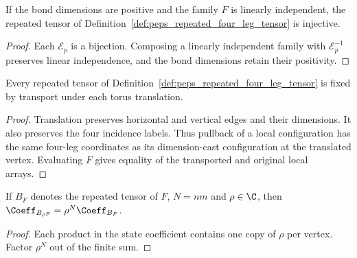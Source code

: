 \begin{lemma}%
    \label{thm:peps_repeated_four_leg_injective}
    \leanok
    If the bond dimensions are positive and the family $F$ is linearly
    independent, the repeated tensor of
    Definition~\ref{def:peps_repeated_four_leg_tensor} is injective.
\end{lemma}
\begin{proof}\leanok
    Each $\mathcal E_p$ is a bijection. Composing a linearly independent
    family with $\mathcal E_p^{-1}$ preserves linear independence, and the
    bond dimensions retain their positivity.
\end{proof}

\begin{lemma}%
    \label{thm:peps_repeated_four_leg_translation_invariant}
    \leanok
    Every repeated tensor of
    Definition~\ref{def:peps_repeated_four_leg_tensor} is fixed by transport
    under each torus translation.
\end{lemma}
\begin{proof}\leanok
    Translation preserves horizontal and vertical edges and their dimensions.
    It also preserves the four incidence labels. Thus pullback of a local
    configuration has the same four-leg coordinates as its dimension-cast
    configuration at the translated vertex. Evaluating $F$ gives equality
    of the transported and original local arrays.
\end{proof}

\begin{lemma}%
    \label{thm:peps_repeated_four_leg_scaling}
    \leanok
    If $B_F$ denotes the repeated tensor of $F$, $N=nm$ and $\rho\in\C$,
    then $\Coeff_{B_{\rho F}}=\rho^N\Coeff_{B_F}$.
\end{lemma}
\begin{proof}\leanok
    Each product in the state coefficient contains one copy of $\rho$ per
    vertex. Factor $\rho^N$ out of the finite sum.
\end{proof}

